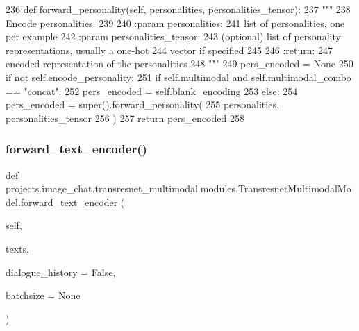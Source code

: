 \begin{DoxyCode}
236     \textcolor{keyword}{def }forward\_personality(self, personalities, personalities\_tensor):
237         \textcolor{stringliteral}{"""}
238 \textcolor{stringliteral}{        Encode personalities.}
239 \textcolor{stringliteral}{}
240 \textcolor{stringliteral}{        :param personalities:}
241 \textcolor{stringliteral}{            list of personalities, one per example}
242 \textcolor{stringliteral}{        :param personalities\_tensor:}
243 \textcolor{stringliteral}{            (optional) list of personality representations, usually a one-hot}
244 \textcolor{stringliteral}{            vector if specified}
245 \textcolor{stringliteral}{}
246 \textcolor{stringliteral}{        :return:}
247 \textcolor{stringliteral}{            encoded representation of the personalities}
248 \textcolor{stringliteral}{        """}
249         pers\_encoded = \textcolor{keywordtype}{None}
250         \textcolor{keywordflow}{if} \textcolor{keywordflow}{not} self.encode\_personality:
251             \textcolor{keywordflow}{if} self.multimodal \textcolor{keywordflow}{and} self.multimodal\_combo == \textcolor{stringliteral}{"concat"}:
252                 pers\_encoded = self.blank\_encoding
253         \textcolor{keywordflow}{else}:
254             pers\_encoded = super().forward\_personality(
255                 personalities, personalities\_tensor
256             )
257         \textcolor{keywordflow}{return} pers\_encoded
258 
\end{DoxyCode}
\mbox{\label{classprojects_1_1image__chat_1_1transresnet__multimodal_1_1modules_1_1TransresnetMultimodalModel_a0dbaa08f20aed129c58237d8d7575197}} 
\subsubsection{\texorpdfstring{forward\+\_\+text\+\_\+encoder()}{forward\_text\_encoder()}}
{\footnotesize\ttfamily def projects.\+image\+\_\+chat.\+transresnet\+\_\+multimodal.\+modules.\+Transresnet\+Multimodal\+Model.\+forward\+\_\+text\+\_\+encoder (\begin{DoxyParamCaption}\item[{}]{self,  }\item[{}]{texts,  }\item[{}]{dialogue\+\_\+history = {\ttfamily False},  }\item[{}]{batchsize = {\ttfamily None} }\end{DoxyParamCaption})}


